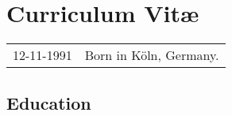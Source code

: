\chapter*{Curriculum Vit\ae}

\makeatletter
\authors{\@firstname\ {\titleshape\@lastname}}
\makeatother

\noindent
\begin{tabular}{p{}l}
    12-11-1991 & Born in Köln, Germany.
\end{tabular}

\section*{Education}

